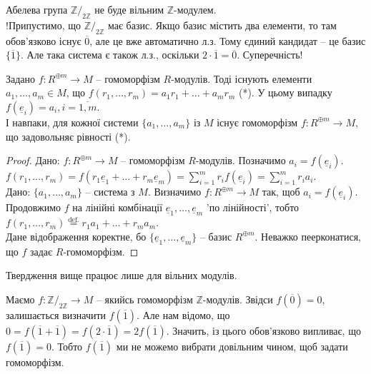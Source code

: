\documentclass{math_library}
\begin{document}
\begin{example}
Абелева група $\mathbb{Z}/_{2 \mathbb{Z}}$ не буде вільним $\mathbb{Z}$-модулем.\\
!Припустимо, що $\mathbb{Z}/_{2 \mathbb{Z}}$ має базис. Якщо базис містить два елементи, то там обов'язково існує $\overline{0}$, але це вже автоматично л.з. Тому єдиний кандидат -- це базис $\{\overline{1}\}$. Але така система є також л.з., оскільки $2 \cdot \overline{1} = \overline{0}$. Суперечність!
\end{example}

\begin{proposition}
\label{construct_homomorphism_based_on_module_elements_and_vice_versa}
Задано $f \colon R^{\oplus m} \to M$ -- гомоморфізм $R$-модулів. Тоді існують елементи $a_1,\dots,a_m \in M$, що $f(r_1,\dots,r_m) = a_1 r_1 + \dots + a_m r_m$ (*). У цьому випадку $f(\underline{e}_i) = a_i, i = \overline{1,m}$.\\
І навпаки, для кожної системи $\{a_1,\dots,a_m\}$ із $M$ існує гомоморфізм $f \colon R^{\oplus m} \to M$, що задовольняє рівності (*).
\end{proposition}

\begin{proof}
\rightproof Дано: $f \colon R^{\oplus m} \to M$ -- гомоморфізм $R$-модулів. Позначимо $a_i = f(\underline{e}_i)$.\\
$f(r_1,\dots,r_m) = f(r_1 \underline{e}_1 + \dots + r_m \underline{e}_m) = \displaystyle\sum_{i=1}^m r_i f(\underline{e}_i) = \sum_{i=1}^m r_i a_i$.
\bigskip \\
\leftproof Дано: $\{a_1,\dots,a_m\}$ -- система з $M$. Визначимо $f \colon R^{\oplus m} \to M$ так, щоб $a_i = f(\underline{e}_i)$. Продовжимо $f$ на лінійні комбінації $\underline{e}_1,\dots,\underline{e}_m$ 'по лінійності', тобто\\
$f(r_1,\dots,r_m) \overset{\text{def.}}{=} r_1 a_1 + \dots + r_m a_m$.\\
Дане відображення коректне, бо $\{\underline{e}_1,\dots,\underline{e}_m\}$ -- базис $R^{\oplus m}$. Неважко пеерконатися, що $f$ задає $R$-гомоморфізм.
\end{proof}

\begin{remark}
Твердження вище працює лише для вільних модулів.
\end{remark}

\begin{example}
Маємо $f \colon \mathbb{Z}/_{2 \mathbb{Z}} \to M$ -- якийсь гомоморфізм $\mathbb{Z}$-модулів. Звідси $f(\overline{0}) = 0$, залишається визначити $f(\overline{1})$. Але нам відомо, що $0 = f(\overline{1}+\overline{1}) = f(2 \cdot \overline{1}) = 2 f(\overline{1})$. Значить, із цього обов'язково випливає, що $f(\overline{1}) = 0$. Тобто $f(\overline{1})$ ми не можемо вибрати довільним чином, щоб задати гомоморфізм.
\end{example}
\end{document}
